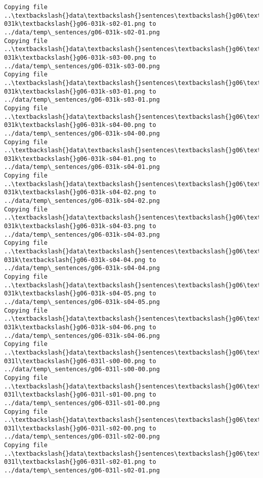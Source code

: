 \documentclass[11pt]{article}
\begin{document}
\begin{Verbatim}[commandchars=\\\{\}]
Copying file ..\textbackslash{}data\textbackslash{}sentences\textbackslash{}g06\textbackslash{}g06-031k\textbackslash{}g06-031k-s02-01.png to
../data/temp\_sentences/g06-031k-s02-01.png
Copying file ..\textbackslash{}data\textbackslash{}sentences\textbackslash{}g06\textbackslash{}g06-031k\textbackslash{}g06-031k-s03-00.png to
../data/temp\_sentences/g06-031k-s03-00.png
Copying file ..\textbackslash{}data\textbackslash{}sentences\textbackslash{}g06\textbackslash{}g06-031k\textbackslash{}g06-031k-s03-01.png to
../data/temp\_sentences/g06-031k-s03-01.png
Copying file ..\textbackslash{}data\textbackslash{}sentences\textbackslash{}g06\textbackslash{}g06-031k\textbackslash{}g06-031k-s04-00.png to
../data/temp\_sentences/g06-031k-s04-00.png
Copying file ..\textbackslash{}data\textbackslash{}sentences\textbackslash{}g06\textbackslash{}g06-031k\textbackslash{}g06-031k-s04-01.png to
../data/temp\_sentences/g06-031k-s04-01.png
Copying file ..\textbackslash{}data\textbackslash{}sentences\textbackslash{}g06\textbackslash{}g06-031k\textbackslash{}g06-031k-s04-02.png to
../data/temp\_sentences/g06-031k-s04-02.png
Copying file ..\textbackslash{}data\textbackslash{}sentences\textbackslash{}g06\textbackslash{}g06-031k\textbackslash{}g06-031k-s04-03.png to
../data/temp\_sentences/g06-031k-s04-03.png
Copying file ..\textbackslash{}data\textbackslash{}sentences\textbackslash{}g06\textbackslash{}g06-031k\textbackslash{}g06-031k-s04-04.png to
../data/temp\_sentences/g06-031k-s04-04.png
Copying file ..\textbackslash{}data\textbackslash{}sentences\textbackslash{}g06\textbackslash{}g06-031k\textbackslash{}g06-031k-s04-05.png to
../data/temp\_sentences/g06-031k-s04-05.png
Copying file ..\textbackslash{}data\textbackslash{}sentences\textbackslash{}g06\textbackslash{}g06-031k\textbackslash{}g06-031k-s04-06.png to
../data/temp\_sentences/g06-031k-s04-06.png
Copying file ..\textbackslash{}data\textbackslash{}sentences\textbackslash{}g06\textbackslash{}g06-031l\textbackslash{}g06-031l-s00-00.png to
../data/temp\_sentences/g06-031l-s00-00.png
Copying file ..\textbackslash{}data\textbackslash{}sentences\textbackslash{}g06\textbackslash{}g06-031l\textbackslash{}g06-031l-s01-00.png to
../data/temp\_sentences/g06-031l-s01-00.png
Copying file ..\textbackslash{}data\textbackslash{}sentences\textbackslash{}g06\textbackslash{}g06-031l\textbackslash{}g06-031l-s02-00.png to
../data/temp\_sentences/g06-031l-s02-00.png
Copying file ..\textbackslash{}data\textbackslash{}sentences\textbackslash{}g06\textbackslash{}g06-031l\textbackslash{}g06-031l-s02-01.png to
../data/temp\_sentences/g06-031l-s02-01.png

\end{Verbatim}
\end{document}
